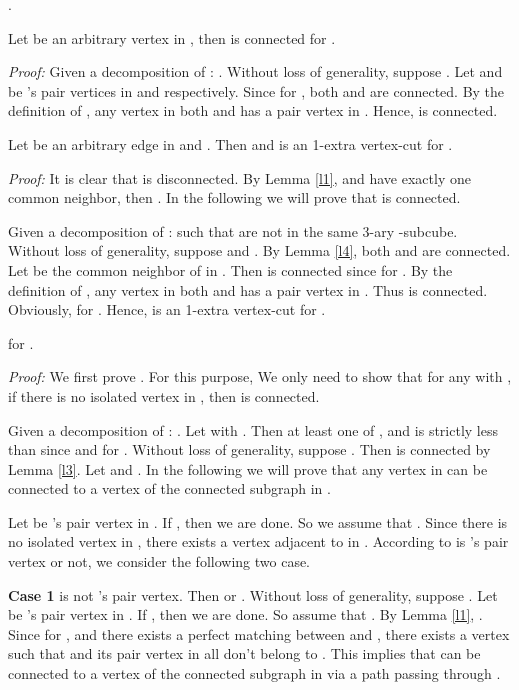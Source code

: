 \documentclass[preprint,number,12pt]{elsarticle}
\begin{document}
\begin{lem}\label{l3} \cite{Bose1995-p1021-1030}
.
\end{lem}

\begin{lem}\label{l4}
Let  be an arbitrary vertex in , then  is connected for .
\end{lem}
\emph{Proof:}
Given a decomposition of : . Without loss of generality, suppose .  Let  and  be 's pair vertices in   and  respectively. Since  for , both   and  are connected.
By the definition of ,
any vertex in both  and  has a pair vertex in .
Hence,  is connected. 

\begin{lem}\label{l5}
Let  be an arbitrary edge in  and . Then  and  is an 1-extra vertex-cut for .
\end{lem}
\emph{Proof:}
It is clear that  is disconnected. By Lemma \ref{l1},  and  have exactly one common neighbor, then .
In the following we will prove that  is connected.

Given a decomposition of :  such that
 are not in the same 3-ary -subcube. Without loss of generality, suppose
 and .
By Lemma \ref{l4}, both  and  are connected. Let
 be the common neighbor of  in .
Then  is connected since  for .
By the definition of ,
any vertex in both  and 
has a pair vertex in . Thus  is connected.
Obviously,  for .
Hence,  is an 1-extra vertex-cut for . 


\begin{thm}\label{t1}
 for .
\end{thm}
\emph{Proof:}
We first prove . For this purpose, We only need to show that for
any  with ,
if there is  no isolated vertex in , then  is connected.

Given a decomposition of : .
Let  with .
Then at least one of ,  and  is strictly less than  since  and  for . Without loss of generality, suppose . Then  is connected by Lemma \ref{l3}.
Let  and .
In the following we will prove that any vertex  in  can be 
connected to a vertex of the connected subgraph  in .

Let  be 's pair vertex in . If , then we are done.
So we assume that . Since there is no isolated vertex in , there exists
a vertex  adjacent to  in . According to  is 's pair vertex or not,
we consider the following two case.

\textbf{Case 1 }  is not 's pair vertex.
Then  or .
Without loss of generality, suppose .
Let  be 's pair vertex in . If ,
then we are done. So assume that .
By Lemma \ref{l1}, .
Since  for , and there exists a perfect matching between
 and , there exists a vertex  such that
 and its pair vertex  in  all don't belong to .
This implies that  can be connected to a vertex of the connected subgraph  in 
via a path passing through .
\end{document}
